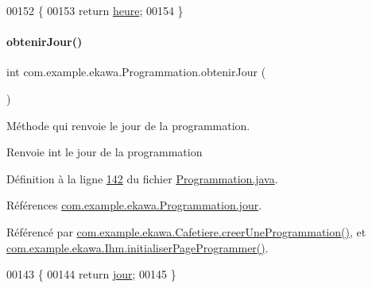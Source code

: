 \begin{DoxyCode}
00152     \{
00153         \textcolor{keywordflow}{return} \hyperlink{classcom_1_1example_1_1ekawa_1_1_programmation_abfff674f6cd5f76ea4b8c37e8c558ffa}{heure};
00154     \}
\end{DoxyCode}
\mbox{\label{classcom_1_1example_1_1ekawa_1_1_programmation_a0e5090c0968474d6887518b7ef659337}} 
\paragraph{\texorpdfstring{obtenir\+Jour()}{obtenirJour()}}
{\footnotesize\ttfamily int com.\+example.\+ekawa.\+Programmation.\+obtenir\+Jour (\begin{DoxyParamCaption}{ }\end{DoxyParamCaption})}



Méthode qui renvoie le jour de la programmation. 

\begin{DoxyReturn}{Renvoie}
int le jour de la programmation 
\end{DoxyReturn}


Définition à la ligne \hyperlink{_programmation_8java_source_l00142}{142} du fichier \hyperlink{_programmation_8java_source}{Programmation.\+java}.



Références \hyperlink{_programmation_8java_source_l00078}{com.\+example.\+ekawa.\+Programmation.\+jour}.



Référencé par \hyperlink{_cafetiere_8java_source_l00731}{com.\+example.\+ekawa.\+Cafetiere.\+creer\+Une\+Programmation()}, et \hyperlink{_ihm_8java_source_l00668}{com.\+example.\+ekawa.\+Ihm.\+initialiser\+Page\+Programmer()}.


\begin{DoxyCode}
00143     \{
00144         \textcolor{keywordflow}{return} \hyperlink{classcom_1_1example_1_1ekawa_1_1_programmation_a96605063cb4177fa382b1ce2388f544f}{jour};
00145     \}
\end{DoxyCode}
\mbox{\label{classcom_1_1example_1_1ekawa_1_1_programmation_a63e8701af99c5bd974e028ba53209887}} 
